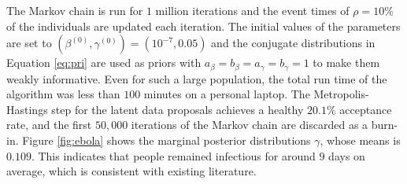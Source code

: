\documentclass[11pt]{article}
\begin{document}
	The Markov chain is run for $1$ million iterations and the event times of $\rho=10\%$ of the individuals are updated each iteration. The initial values of the parameters are set to $(\beta^{(0)}, \gamma^{(0)}) = (10^{-7}, 0.05)$ and the conjugate distributions in Equation \ref{eq:pri} are used as priors with $a_{\beta} = b_{\beta} = a_{\gamma} = b_{\gamma} = 1$ to make them weakly informative. Even for such a large population, the total run time of the algorithm was less than $100$ minutes on a personal laptop.
	The Metropolis-Hastings step for the latent data proposals achieves a healthy $20.1\%$ acceptance rate, and the first $50,000$ iterations of the Markov chain are discarded as a burn-in.
	Figure \ref{fig:ebola} shows the marginal posterior distributions $\gamma$, whose means is $0.109$. This indicates that people remained infectious for around $9$ days on average, which is consistent with existing literature. 
	
\end{document}
